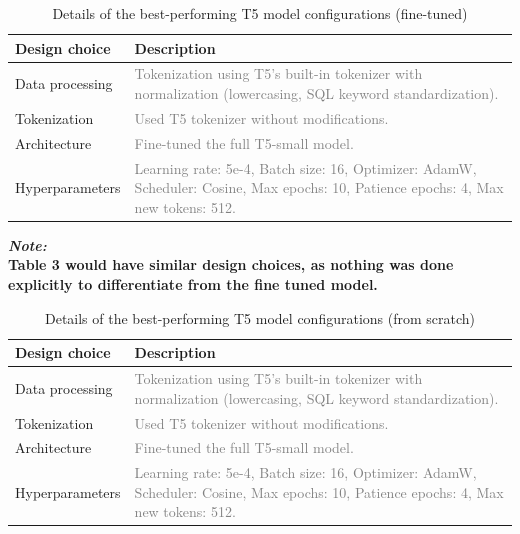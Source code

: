 \documentclass{article}
\begin{document}
\begin{table}[h!]
\centering
\begin{tabular}{p{3.5cm}p{10cm}}
\toprule
Design choice & Description \\
\midrule
Data processing & \textcolor{gray}{Tokenization using T5’s built-in tokenizer with normalization
(lowercasing, SQL keyword standardization).} \\
Tokenization & \textcolor{gray}{Used T5 tokenizer without modifications.} \\
Architecture & \textcolor{gray}{ Fine-tuned the full T5-small model.} \\
Hyperparameters & \textcolor{gray}{Learning rate: 5e-4, \newline  Batch size: 16, \newline Optimizer: AdamW, \newline Scheduler: Cosine, \newline Max epochs: 10, \newline Patience epochs: 4, \newline Max new tokens: 512.} \\
\bottomrule
\end{tabular}
\caption{Details of the best-performing T5 model configurations (fine-tuned)}
\label{tab:t5_results_ft}
\end{table}

\textbf{\textit{Note:} \\ Table 3 would have similar design choices, as nothing was done explicitly to differentiate from the fine tuned model.}

\begin{table}[h!]
\centering
\begin{tabular}{p{3.5cm}p{10cm}}
\toprule
Design choice & Description \\
\midrule
Data processing & \textcolor{gray}{Tokenization using T5’s built-in tokenizer with normalization
(lowercasing, SQL keyword standardization).} \\
Tokenization & \textcolor{gray}{Used T5 tokenizer without modifications.} \\
Architecture & \textcolor{gray}{ Fine-tuned the full T5-small model.} \\
Hyperparameters & \textcolor{gray}{Learning rate: 5e-4, \newline  Batch size: 16, \newline Optimizer: AdamW, \newline Scheduler: Cosine, \newline Max epochs: 10, \newline Patience epochs: 4, \newline Max new tokens: 512.} \\
\bottomrule
\end{tabular}
\caption{Details of the best-performing T5 model configurations (from scratch)}
\label{tab:t5_results_scratch}
\end{table}
\end{document}
